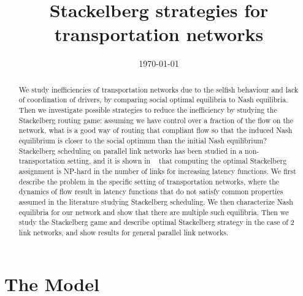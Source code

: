 

\usepackage{amsmath}
\usepackage{amsfonts}
\usepackage[utf8]{inputenc}
\usepackage{graphicx}
\usepackage{hyperref}


\title{Stackelberg strategies for transportation networks}
\date{\today}



\maketitle


\begin{abstract}
We study inefficiencies of transportation networks due to the selfish behaviour and lack of coordination of drivers, by comparing social optimal equilibria to Nash equilibria. Then we investigate possible strategies to reduce the inefficiency by studying the Stackelberg routing game: assuming we have control over a fraction of the flow on the network, what is a good way of routing that compliant flow so that the induced Nash equilibrium is closer to the social optimum than the initial Nash equilibrium? Stackelberg scheduling on parallel link networks has been studied in a non-transportation setting, and it is shown in ~\cite{rou01} that computing the optimal Stackelberg assignment is NP-hard in the number of links for increasing latency functions.
We first describe the problem in the specific setting of transportation networks, where the dynamics of flow result in latency functions that do not satisfy common properties assumed in the literature studying Stackelberg scheduling. We then characterize Nash equilibria for our network and show that there are multiple such equilibria. Then we study the Stackelberg game and describe optimal Stackelberg strategy in the case of 2 link networks, and show results for general parallel link networks.
\end{abstract}


\section{The Model}

